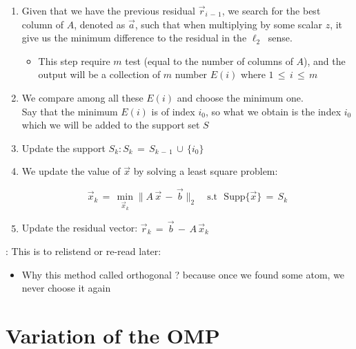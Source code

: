 \documentclass[12pt,a4paper]{book}
\begin{document}
 \begin{enumerate}
     
     \item  Given that we have the previous residual $\Vec{r}_{i \, - \, 1}$, we search for the best column of $A$, denoted as $\Vec{a}$, such that when multiplying by some scalar $z$, it give us the minimum difference to the residual in the $\ell_2 ~$  sense.
     
        \begin{itemize}
            \item This step require $m$ test (equal to the number of columns of $A$), and the output will be a collection of $m$ number $E(i)$ where $1 \, \leq \, i \, \leq \, m$
        \end{itemize}
     
     \item We compare among all these $E(i)$ and choose the minimum one.\\
     
     Say that the minimum $E(i)$ is of index $i_0$, so what we obtain is the index $i_0$ which we will be added to the support set $S$
     
     \item Update the support $S_k: S_k \, = \, S_{k \, - \, 1} \, \displaystyle\cup \, \{ i_0\}$
     
     \item We update the value of $\Vec{x}$ by solving a least square problem: 
     
     \begin{equation}
         \Vec{x}_k \, = \, \min_{\Vec{x}_k} \lVert A \, \Vec{x} \, - \, \Vec{b} \rVert_2 \quad \text{s.t } \text{ Supp} \{\Vec{x}\} \, = \,  S_k
     \end{equation}
     
     
     \item Update the residual vector: $\Vec{r}_k \, = \, \Vec{b} \, - \, A \, \Vec{x}_k$
     
     
 \end{enumerate}
 
 
 : This is to relistend or re-read later:
 
 \begin{itemize}
     \item Why this method called orthogonal ? because once we found some atom, we never choose it again
 \end{itemize}
 

\section{Variation of the OMP}
\end{document}
